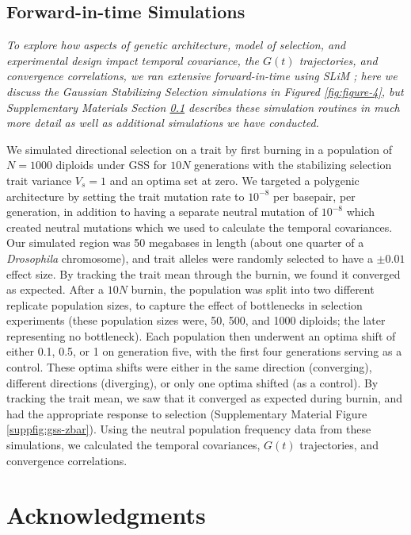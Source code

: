 \documentclass[11pt]{article}
\newcommand{\vb}[1]{{\it \color{blue} #1}}
\begin{document}
\subsection{Forward-in-time Simulations}
\label{supp:forward}
\vb{
To explore how aspects of genetic architecture, model of selection, and
experimental design impact temporal covariance, the $G(t)$ trajectories, and
convergence correlations, we ran extensive forward-in-time using SLiM
\parencite{Haller2019-vu}; here we discuss the Gaussian Stabilizing Selection
simulations in Figured \ref{fig:figure-4}, but Supplementary Materials Section
\ref{supp:forward} describes these simulation routines in much more detail as
well as additional simulations we have conducted.

We simulated directional selection on a trait by first burning in a population
of $N = 1000$ diploids under GSS for $10N$ generations with the stabilizing
selection trait variance $V_s = 1$ and an optima set at zero. We targeted a
polygenic architecture by setting the trait mutation rate to $10^{-8}$ per
basepair, per generation, in addition to having a separate neutral mutation of
$10^{-8}$ which created neutral mutations which we used to calculate the
temporal covariances. Our simulated region was 50 megabases in length (about
one quarter of a \emph{Drosophila} chromosome), and trait alleles were randomly
selected to have a $\pm 0.01$ effect size. By tracking the trait mean through
the burnin, we found it converged as expected. After a $10N$ burnin, the
population was split into two different replicate population sizes, to capture
the effect of bottlenecks in selection experiments (these population sizes
were, 50, 500, and 1000 diploids; the later representing no bottleneck). Each
population then underwent an optima shift of either 0.1, 0.5, or 1 on
generation five, with the first four generations serving as a control. These
optima shifts were either in the same direction (converging), different
directions (diverging), or only one optima shifted (as a control). By tracking
the trait mean, we saw that it converged as expected during burnin, and had the
appropriate response to selection (Supplementary Material Figure
\ref{suppfig:gss-zbar}). Using the neutral population frequency data from these
simulations, we calculated the temporal covariances, $G(t)$ trajectories, and
convergence correlations.
}

\section{Acknowledgments} 
\end{document}
